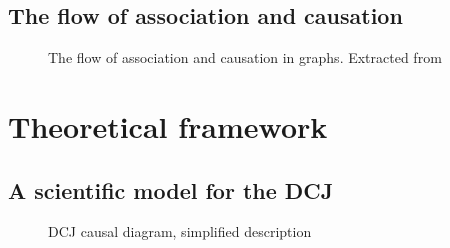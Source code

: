 \documentclass[
  authoryear,
  preprint,
  1p]{elsarticle}
\begin{document}
\subsection{The flow of association and
causation}\label{sec-prelim-flow}

\begin{figure}


\caption{\label{fig-ACflow}The flow of association and causation in
graphs. Extracted from \citet[31]{Neal_2020}}

\end{figure}%

\section{Theoretical framework}\label{sec-theory}

\subsection{A scientific model for the DCJ}\label{sec-theory-scientific}

\begin{figure}


\caption{\label{fig-SciModel_simp1}DCJ causal diagram, simplified
description}

\end{figure}%
\end{document}
